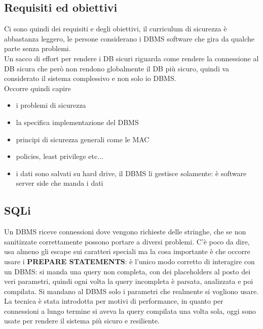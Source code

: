 \documentclass[12pt, oneside]{extbook} %
\begin{document}
\subsection{Requisiti ed obiettivi}
Ci sono quindi dei requisiti e degli obiettivi, il curriculum di sicurezza è abbastanza leggero, le persone considerano i DBMS software che gira da qualche parte senza problemi.\\Un sacco di effort per rendere i DB sicuri riguarda come rendere la connessione al DB sicura che però non rendono globalmente il DB più sicuro, quindi va considerato il sistema complessivo e non solo io DBMS.\\Occorre quindi capire 
\begin{itemize}
	\item i problemi di sicurezza
	\item la specifica implementazione del DBMS
	\item principi di sicurezza generali come le MAC
	\item policies, least privilege etc...
	\item i dati sono salvati su hard drive, il DBMS li gestisce solamente: è software server side che manda i dati
\end{itemize}

\subsection{SQLi}
Un DBMS riceve connessioni dove vengono richieste delle stringhe, che se non sanitizzate correttamente possono portare a diversi problemi. C'è poco da dire, usa almeno gli escape sui caratteri speciali ma la cosa importante è che occorre usare i \textbf{PREPARE STATEMENTS}: è l'unico modo corretto di interagire con un DBMS: si manda una query non completa, con dei placeholders al posto dei veri parametri, quindi ogni volta la query incompleta è parsata, analizzata e poi compilata. Si mandano al DBMS solo i parametri che realmente si vogliono usare. La tecnica è stata introdotta per motivi di performance, in quanto per connessioni a lungo termine si aveva la query compilata una volta sola, oggi sono usate per rendere il sistema più sicuro e resiliente.
\end{document}
